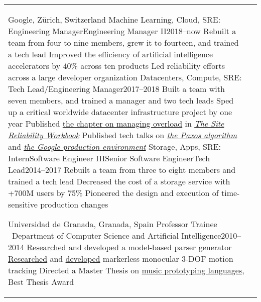 \documentclass[letterpaper,10pt,oneside]{article}
\newcommand{\DatestampY}[1]{#1}
\newenvironment{body}
{\par\par
\begin{longtable}{p{0.142\textwidth}p{0.807\textwidth}}}
{\par\end{longtable}\par}
\newcommand{\SmallEntryGap}{\par\vspace{0.1em}\par}
\begin{document}
\begin{body}
Google, Z\"urich, Switzerland\newline
\phantom{w}Machine Learning, Cloud, SRE: Engineering Manager\textrightarrow Engineering Manager II\hfill \DatestampY{2018}--now\setlength{\dimen0}{\widthof{now}}\hspace{-\dimen0}\hphantom{\DatestampY{2000}} \newline
\phantom{ww}Rebuilt a team from four to nine members, grew it to fourteen, and trained a tech lead\newline
\phantom{ww}Improved the efficiency of artificial intelligence accelerators by 40\% across ten products\newline
\phantom{ww}Led reliability efforts across a large developer organization\newline
\phantom{w}Datacenters, Compute, SRE: Tech Lead/Engineering Manager\hfill \DatestampY{2017}--\DatestampY{2018} \newline
\phantom{ww}Built a team with seven members, and trained a manager and two tech leads\newline
\phantom{ww}Sped up a critical worldwide datacenter infrastructure project by one year\newline
\phantom{ww}Published \href{https://landing.google.com/sre/workbook/chapters/overload/}{the chapter on managing overload} in \textit{\href{https://landing.google.com/sre/books/}{The Site Reliability Workbook}}\newline
\phantom{ww}Published tech talks on \textit{\href{https://youtu.be/d7nAGI_NZPk}{the Paxos algorithm}} and \textit{\href{https://youtu.be/dhTVVWzpc4Q}{the Google production environment}}\newline
\phantom{w}Storage, Apps, SRE: Intern\textrightarrow Software Engineer III\textrightarrow Senior Software Engineer\textrightarrow Tech Lead\hfill \DatestampY{2014}--\DatestampY{2017} \newline
\phantom{ww}Rebuilt a team from three to eight members and trained a tech lead\newline
\phantom{ww}Decreased the cost of a storage service with +700M users by 75\%\newline
\phantom{ww}Pioneered the design and execution of time-sensitive production changes

\SmallEntryGap

Universidad de Granada, Granada, Spain\newline
\phantom{w}Professor Trainee \textendash\ Department of Computer Science and Artificial Intelligence\hfill \DatestampY{2010}--\DatestampY{2014} \newline
\phantom{ww}\href{https://doi.org/10.1142/S0218194014500375}{Researched} and \href{https://github.com/lquesada/ModelCC}{developed} a model-based parser generator \newline
\phantom{ww}\href{https://doi.org/10.1142/S0129065712500190}{Researched} and \href{https://github.com/lquesada/MotionTracking}{developed} markerless monocular 3-DOF motion tracking \newline
\phantom{ww}Directed a Master Thesis on \href{https://github.com/lquesada/ADAgio}{music prototyping languages}, Best Thesis Award


\end{body}
\end{document}
